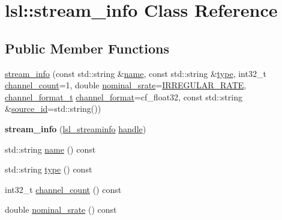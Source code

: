 \hypertarget{classlsl_1_1stream__info}{}\section{lsl\+:\+:stream\+\_\+info Class Reference}
\label{classlsl_1_1stream__info}
\subsection*{Public Member Functions}
\begin{DoxyCompactItemize}
\item 
\hyperlink{classlsl_1_1stream__info_a874f4899da89168b768cfe9acdd569a0}{stream\+\_\+info} (const std\+::string \&\hyperlink{classlsl_1_1stream__info_a0862e5c580d65ecf9ceb1fcc26f2ca34}{name}, const std\+::string \&\hyperlink{classlsl_1_1stream__info_a2162830f6867e9513eba9385eb0cbb99}{type}, int32\+\_\+t \hyperlink{classlsl_1_1stream__info_acf09957c1c61a9d9e0f9439037eec305}{channel\+\_\+count}=1, double \hyperlink{classlsl_1_1stream__info_a35b9b9b8947915f9f9518333342e2835}{nominal\+\_\+srate}=\hyperlink{namespacelsl_ac7ebddefe1091ef2d9459b6f9d79f7ab}{I\+R\+R\+E\+G\+U\+L\+A\+R\+\_\+\+R\+A\+TE}, \hyperlink{namespacelsl_a28d50dae6fd82eea8893ce3d63ccd46c}{channel\+\_\+format\+\_\+t} \hyperlink{classlsl_1_1stream__info_aa9695e52570e617d1c7dd4ea9f88b15d}{channel\+\_\+format}=cf\+\_\+float32, const std\+::string \&\hyperlink{classlsl_1_1stream__info_a1f20c68246a88047978d9b03e14a9d2b}{source\+\_\+id}=std\+::string())
\item 
\mbox{\label{classlsl_1_1stream__info_a7358ba03d8741b0b194cf9e747405702}} 
{\bfseries stream\+\_\+info} (\hyperlink{namespacelsl_aa0a9ce9956061679949daa2e35aae2e8}{lsl\+\_\+streaminfo} \hyperlink{classlsl_1_1stream__info_a532f6e8b29052cf11fbf87aeb3424304}{handle})
\item 
std\+::string \hyperlink{classlsl_1_1stream__info_a0862e5c580d65ecf9ceb1fcc26f2ca34}{name} () const
\item 
std\+::string \hyperlink{classlsl_1_1stream__info_a2162830f6867e9513eba9385eb0cbb99}{type} () const
\item 
int32\+\_\+t \hyperlink{classlsl_1_1stream__info_acf09957c1c61a9d9e0f9439037eec305}{channel\+\_\+count} () const
\item 
double \hyperlink{classlsl_1_1stream__info_a35b9b9b8947915f9f9518333342e2835}{nominal\+\_\+srate} () const
\item 

\end{DoxyCompactItemize}
